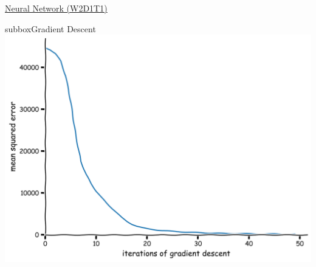\begin{textbox}{\href{https://compneuro.neuromatch.io/tutorials/W2D1_DeepLearning/student/W2D1_Tutorial1.html}{Neural Network (W2D1T1)} }
\begin{subbox}{subbox}{Gradient Descent}
\centering
\includegraphics[scale=0.1]{Figures/DL/DLFigure2.png}
\end{subbox}

\end{textbox}
